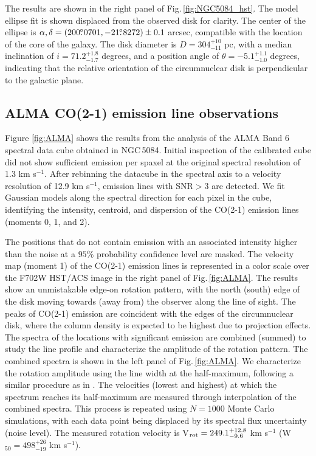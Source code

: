 \documentclass[modern]{CORE-AAS/aastex631}
\begin{document}
The results are shown in the right panel of Fig.\,\ref{fig:NGC5084_hst}. The model ellipse fit is shown displaced from the observed disk for clarity. The center of the ellipse is $\alpha, \delta = (200\mbox{$.\!\!^\circ$}0701, -21\mbox{$.\!\!^\circ$}8272) \pm 0.1$ arcsec, compatible with the location of the core of the galaxy. The disk diameter is  $D=304^{+10}_{-11}$ pc, with a median inclination of $i=71.2^{+1.8}_{-1.7}$ degrees, and a position angle of $\theta = -5.1^{+1.1}_{-1.0}$ degrees, indicating that the relative orientation of the circumnuclear disk is perpendicular to the galactic plane.


\subsection{ALMA CO(2-1) emission line observations}
\label{subsec:results_alma}


Figure \ref{fig:ALMA} shows the results from the analysis of the ALMA Band 6 spectral data cube obtained in NGC\,5084. Initial inspection of the calibrated cube did not show sufficient emission per spaxel at the original spectral resolution of 1.3 km s$^{-1}$. After rebinning the datacube in the spectral axis to a velocity resolution of 12.9 km s$^{-1}$, emission lines with SNR$>3$ are detected. We fit Gaussian models along the spectral direction for each pixel in the cube, identifying the intensity, centroid, and dispersion of the CO(2-1) emission lines (moments 0, 1, and 2). 

The positions that do not contain emission with an associated intensity higher than the noise at a $95\%$ probability confidence level are masked. The velocity map (moment 1) of the CO(2-1) emission lines is represented in a color scale over the F702W HST/ACS image in the right panel of Fig.\,\ref{fig:ALMA}. The results show an unmistakable edge-on rotation pattern, with the north (south) edge of the disk moving towards (away from) the observer along the line of sight. The peaks of CO(2-1) emission are coincident with the edges of the circumnuclear disk, where the column density is expected to be highest due to projection effects.\\ 

The spectra of the locations with significant emission are combined (summed) to study the line profile and characterize the amplitude of the rotation pattern. The combined spectra is shown in the left panel of Fig.\,\ref{fig:ALMA}. We characterize the rotation amplitude using the line width at the half-maximum, following a similar procedure as in \citep[W$_{50}$,][]{smith+2021mnras500_1933}. The velocities (lowest and highest) at which the spectrum reaches its half-maximum are measured through interpolation of the combined spectra. This process is repeated using $N=1000$ Monte Carlo simulations, with each data point being displaced by its spectral flux uncertainty (noise level). The measured rotation velocity is V$_{\rm rot} = 249.1^{+12.8}_{-9.6}$ km s$^{-1}$ (W$_{50}=498^{+26}_{-19}$ km s$^{-1}$).\\
\end{document}

